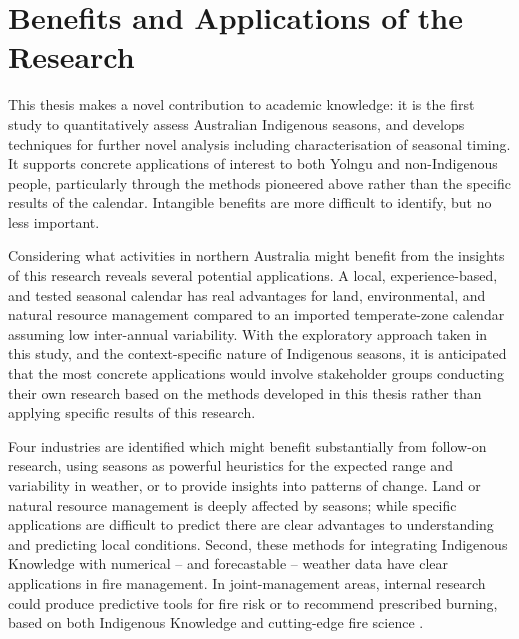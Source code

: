 \section{Benefits and Applications of the Research}
\label{sec:applications-benefits}


This thesis makes a novel contribution to academic knowledge: it is the
first study to quantitatively assess Australian Indigenous seasons, and
develops techniques for further novel analysis including characterisation
of seasonal timing.
%
It supports concrete applications of interest to both Yolngu and
non-Indigenous people, particularly through the methods pioneered above
rather than the specific results of the calendar.  Intangible benefits
are more difficult to identify, but no less important.


Considering what activities in northern Australia might benefit from the
insights of this research reveals several potential applications.  A local,
experience-based, and tested seasonal calendar has real
advantages for land, environmental, and natural resource management compared
to an imported temperate-zone calendar assuming low inter-annual variability.
%
With the exploratory approach taken in this study, and the context-specific
nature of Indigenous seasons, it is anticipated that the most concrete applications
would involve stakeholder groups conducting their own research based on the
methods developed in this thesis rather than applying specific results of this research.


Four industries are identified which might benefit substantially from follow-on
research, using seasons as powerful heuristics for the expected range
and variability in weather, or to provide insights into patterns of change.
%
Land or natural resource management is deeply affected by seasons; while
specific applications are difficult to predict there are clear advantages
to understanding and predicting local conditions.
%
Second, these methods for integrating Indigenous Knowledge with numerical --
and forecastable -- weather data have clear applications in fire management.
In joint-management areas, internal research could produce predictive tools
for fire risk or to recommend prescribed burning, based on both Indigenous
Knowledge and cutting-edge fire science .

